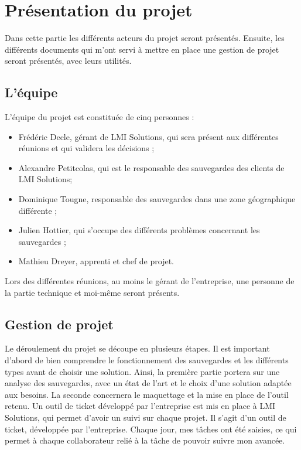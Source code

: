 \documentclass[pfe]{tnreport} %
\begin{document}
\chapter{Présentation du projet}

Dans cette partie les différents acteurs du projet seront présentés. \newline
Ensuite, les différents documents qui m'ont servi à mettre en place une gestion de projet seront présentés, avec leurs utilités.

\section{L'équipe}

L'équipe du projet est constituée de cinq personnes : \newline
\begin{itemize}
 \item Frédéric Decle, gérant de LMI Solutions, qui sera présent aux différentes réunions et qui validera les décisions ;
 \item Alexandre Petitcolas, qui est le responsable des sauvegardes des clients de LMI Solutions;
 \item Dominique Tougne, responsable des sauvegardes dans une zone géographique différente ;
 \item Julien Hottier, qui s'occupe des différents problèmes concernant les sauvegardes ;
 \item Mathieu Dreyer, apprenti et chef de projet. \newline
\end{itemize}

Lors des différentes réunions, au moins le gérant de l'entreprise, une personne de la partie technique et moi-même seront présents.

\section{Gestion de projet}

Le déroulement du projet se découpe en plusieurs étapes. Il est important d'abord de bien comprendre le fonctionnement des sauvegardes et les différents types avant de choisir une solution. \newline
Ainsi, la première partie portera sur une analyse des sauvegardes, avec un état de l'art et le choix d'une solution adaptée aux besoins. La seconde concernera le maquettage et la mise en place de l'outil retenu. \newline
Un outil de ticket développé par l'entreprise est mis en place à LMI Solutions, qui permet d'avoir un suivi sur chaque projet. \newline
Il s'agit d'un outil de ticket, développée par l'entreprise. Chaque jour, mes tâches ont été saisies, ce qui permet à chaque collaborateur relié à la tâche de pouvoir suivre mon avancée. \newline
\end{document}
